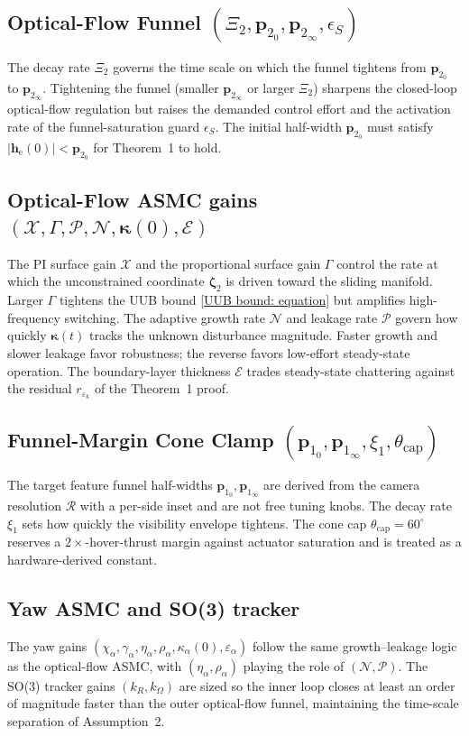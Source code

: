 \documentclass{IEEEtaes}
\begin{document}
\subsection{Optical-Flow Funnel $(\Xi_2, \boldsymbol{p}_{2_0}, \boldsymbol{p}_{2_\infty}, \epsilon_S)$} The decay rate $\Xi_2$ governs the time scale on which the funnel tightens from $\boldsymbol{p}_{2_0}$ to $\boldsymbol{p}_{2_\infty}$. Tightening the funnel (smaller $\boldsymbol{p}_{2_\infty}$ or larger $\Xi_2$) sharpens the closed-loop optical-flow regulation but raises the demanded control effort and the activation rate of the funnel-saturation guard $\epsilon_S$. The initial half-width $\boldsymbol{p}_{2_0}$ must satisfy $|\boldsymbol{h}_\text{e}(0)|<\boldsymbol{p}_{2_0}$ for Theorem~1 to hold.

\subsection{Optical-Flow ASMC gains $(\mathcal{X}, \Gamma, \mathcal{P}, \mathcal{N}, \boldsymbol{\kappa}(0), \mathcal{E})$} The PI surface gain $\mathcal{X}$ and the proportional surface gain $\Gamma$ control the rate at which the unconstrained coordinate $\boldsymbol{\zeta}_2$ is driven toward the sliding manifold. Larger $\Gamma$ tightens the UUB bound \eqref{UUB bound: equation} but amplifies high-frequency switching. The adaptive growth rate $\mathcal{N}$ and leakage rate $\mathcal{P}$ govern how quickly $\boldsymbol{\kappa}(t)$ tracks the unknown disturbance magnitude. Faster growth and slower leakage favor robustness; the reverse favors low-effort steady-state operation. The boundary-layer thickness $\mathcal{E}$ trades steady-state chattering against the residual $r_{\varepsilon_k}$ of the Theorem~1 proof.

\subsection{Funnel-Margin Cone Clamp $(\boldsymbol{p}_{1_0}, \boldsymbol{p}_{1_\infty}, \xi_1, \theta_\text{cap})$} The target feature funnel half-widths $\boldsymbol{p}_{1_0}, \boldsymbol{p}_{1_\infty}$ are derived from the camera resolution $\mathcal{R}$ with a per-side inset and are not free tuning knobs. The decay rate $\xi_1$ sets how quickly the visibility envelope tightens. The cone cap $\theta_\text{cap}=60^\circ$ reserves a $2\times$-hover-thrust margin against actuator saturation and is treated as a hardware-derived constant.

\subsection{Yaw ASMC and SO(3) tracker} The yaw gains $(\chi_\alpha, \gamma_\alpha, \eta_\alpha, \rho_\alpha, \kappa_\alpha(0), \varepsilon_\alpha)$ follow the same growth--leakage logic as the optical-flow ASMC, with $(\eta_\alpha, \rho_\alpha)$ playing the role of $(\mathcal{N}, \mathcal{P})$. The SO(3) tracker gains $(k_R, k_\Omega)$ are sized so the inner loop closes at least an order of magnitude faster than the outer optical-flow funnel, maintaining the time-scale separation of Assumption~2.
\end{document}
